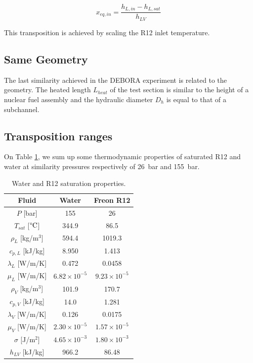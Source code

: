 \begin{equation}
x_{eq,in} = \frac{h_{L,in} - h_{L,sat}}{h_{LV}}
\end{equation}

\begin{note*}{}
This transposition is achieved by scaling the R12 inlet temperature.
\end{note*}

\subsection{Same Geometry}

The last similarity achieved in the DEBORA experiment is related to the geometry. The heated length $L_{heat}$ of the test section is similar to the height of a nuclear fuel assembly and the hydraulic diameter $D_{h}$ is equal to that of a subchannel.


\subsection{Transposition ranges}

On Table \ref{tab:R12_PWR_properties}, we sum up some thermodynamic properties of saturated R12 and water at similarity pressures respectively of 26\ bar and 155\ bar.

\begin{table}[!h]
\centering
\begin{tabular}{c||c|c} 

Fluid & Water & Freon R12 \\
\hline 
\hline
$P$ [bar] & 155 & 26\\
%
$T_{sat}$ [$\degree\mathrm{C}$] & 344.9 & 86.5 \\
%
\hline
\hline
$\rho_{L}$ [kg/m$^{3}$] & 594.4 & 1019.3 \\
%
$c_{p,L}$ [kJ/kg] & 8.950 & 1.413\\ 
%
$\lambda_{L}$ [W/m/K] & 0.472 & 0.0458\\
%
$\mu_{L}$ [W/m/K] & $6.82 \times 10^{-5}$ & $9.23 \times 10^{-5}$\\
\hline
\hline 
$\rho_{V}$ [kg/m$^{3}$] & 101.9 & 170.7 \\
%
$c_{p,V}$ [kJ/kg] & 14.0 & 1.281\\ 
%
$\lambda_{V}$ [W/m/K] & 0.126 & 0.0175\\
%
$\mu_{V}$ [W/m/K] & $2.30 \times 10^{-5}$ & $1.57 \times 10 ^{-5}$\\
\hline
\hline
$\sigma$ [J/m$^{2}$] & $4.65\times 10^{-3}$ & $1.80 \times 10^{-3}$ \\
%
$h_{LV}$ [kJ/kg] & 966.2 & 86.48 \\
\end{tabular}

\caption{Water and R12 saturation properties.}
\label{tab:R12_PWR_properties}

\end{table}



